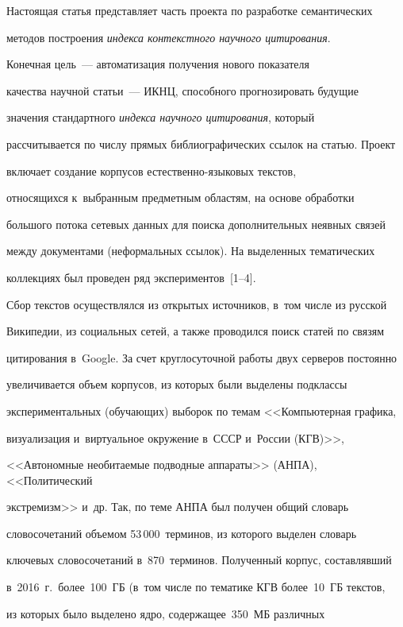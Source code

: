   Настоящая статья представляет часть проекта по разработке семантических 


методов построения \textit{индекса контекстного научного цитирования}. 


Конечная цель~--- автоматизация получения нового показателя 


качества научной статьи~--- ИКНЦ, способного прогнозировать будущие 


значения стандартного \textit{индекса научного цитирования}, который 


рассчитывается по числу прямых библиографических ссылок на статью. Проект 


включает создание корпусов ес\-тест\-вен\-но-язы\-ко\-вых текстов, 


относящихся к~выбранным предметным областям, на основе обработки 


большого потока сетевых данных для поиска дополнительных неявных связей 


между документами (неформальных ссылок). На выделенных тематических 


коллекциях был проведен ряд экспериментов~[1--4].


  


  Сбор текстов осуществлялся из открытых источников, в~том числе из русской 


Википедии, из социальных сетей, а также проводился поиск статей по связям 


цитирования в~Google. За счет круглосуточной работы двух серверов постоянно 


увеличивается объем корпусов, из которых были выделены подклассы 


экспериментальных (обучающих) выборок по темам <<Компьютерная графика, 


визуализация и~виртуальное окружение в~СССР и~России (КГВ)>>, 


<<Автономные необитаемые подводные аппараты>> (АНПА), <<Политический 


экстремизм>> и~др. Так, по теме АНПА был получен общий словарь 


словосочетаний объемом 53\,000~терминов, из которого выделен словарь 


ключевых словосочетаний в~870~терминов. Полученный корпус, составлявший 


в~2016~г.\ более~100~ГБ (в~том числе по тематике КГВ более~10~ГБ текстов, 


из которых было выделено ядро, содержащее~350~МБ различных 


